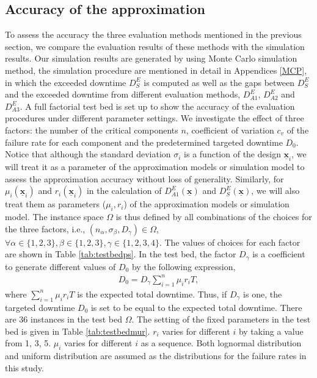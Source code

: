 \documentclass[preprint,12pt]{elsarticle}
\begin{document}
\subsection{Accuracy of the approximation}
To assess the accuracy the three evaluation methods mentioned in the previous section, we compare the evaluation results of these methods with the simulation results. Our simulation results are generated by using Monte Carlo simulation method, the simulation procedure are mentioned in detail in Appendices \ref{MCP}, in which the exceeded downtime $D^{E}_{S}$ is computed as well as the gaps between $D^{E}_S$ and the exceeded downtime from different evaluation methods, $D^{E}_{A1}$, $D^{E}_{A2}$ and $D^{E}_{A3}$. A full factorial test bed is set up to show the accuracy of the evaluation procedures under different parameter settings. We investigate the effect of three factors: the number of the critical components $n$, coefficient of variation $c_{v}$ of the failure rate for each component and the predetermined targeted downtime $D_{0}$. Notice that although the standard deviation $\sigma_{i}$ is a function of the design $\underline{\boldsymbol{x}}_{i}$, we will treat it as a parameter of the approximation models or simulation model to assess the approximation accuracy without loss of generality. Similarly, for $\mu_{i}(\underline{\boldsymbol{x}}_{i})$ and $r_{i}(\underline{\boldsymbol{x}}_{i})$ in the calculation of $D^{E}_{A1}(\underline{\boldsymbol{x}})$ and $D^{E}_{S}(\underline{\boldsymbol{x}})$, we will also treat them as parameters ($\mu_{i} , r_{i}$) of the approximation models or simulation model. The instance space $\Omega$ is thus defined by all combinations of the choices for the three factors, i.e., $(n_{\alpha},\sigma_{\beta},D_{\gamma}) \in \Omega$, $\forall \alpha \in \{1,2,3\}, \beta \in \{1,2,3\}, \gamma \in \{1,2,3,4\}$. The values of choices for each factor are shown in Table \ref{tab:testbedps}. In the test bed, the factor $D_{\gamma}$ is a coefficient to generate different values of $D_0$ by the following expression,
 \begin{eqnarray}
 D_{0} = D_{\gamma}\sum_{i=1}^{n}{\mu_{i} r_{i} T}, \label{D0}
\end{eqnarray}
where $\sum_{i=1}^{n}{\mu_{i} r_{i} T}$ is the expected total downtime. Thus, if $D_{\gamma}$ is one, the targeted downtime $D_0$ is set to be equal to the expected total downtime.
There are 36 instances in the test bed $\Omega$. The setting of the fixed parameters in the test bed is given in Table \ref{tab:testbedmur}. $r_{i}$ varies for different $i$ by taking a value from {1, 3, 5}. $\mu_{i}$ varies for different $i$ as a sequence. Both lognormal distribution and uniform distribution are assumed as the distributions for the failure rates in this study.
\end{document}
